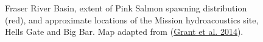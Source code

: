 \documentclass[11pt]{book}
\begin{document}
\begin{figure}[htb]

{\centering {} 

}

\caption{Fraser River Basin, extent of Pink Salmon spawning distribution (red), and approximate locations of the Mission hydroacoustics site, Hells Gate and Big Bar. Map adapted from (\protect\hyperlink{ref-grantFraserRiverPink2014}{Grant et al. 2014}).}\label{fig:fig-map}
\end{figure}
\end{document}
